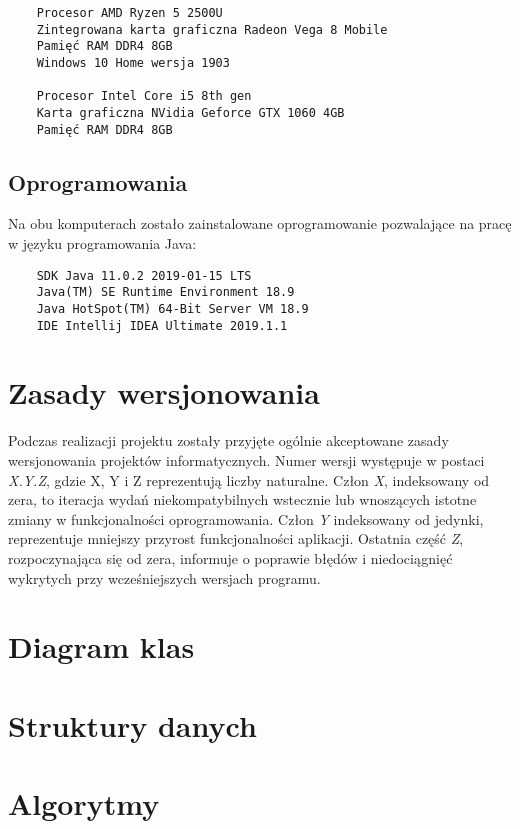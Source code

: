 \documentclass{article}
\begin{document}
\begin{verbatim}
    Procesor AMD Ryzen 5 2500U
    Zintegrowana karta graficzna Radeon Vega 8 Mobile
    Pamięć RAM DDR4 8GB
    Windows 10 Home wersja 1903
    
    Procesor Intel Core i5 8th gen
    Karta graficzna NVidia Geforce GTX 1060 4GB
    Pamięć RAM DDR4 8GB
\end{verbatim}

\subsection{Oprogramowania}

Na obu komputerach zostało zainstalowane oprogramowanie pozwalające na pracę w języku programowania Java:

\begin{verbatim}
    SDK Java 11.0.2 2019-01-15 LTS
    Java(TM) SE Runtime Environment 18.9
    Java HotSpot(TM) 64-Bit Server VM 18.9
    IDE Intellij IDEA Ultimate 2019.1.1 
\end{verbatim}

\section{Zasady wersjonowania}

Podczas realizacji projektu zostały przyjęte ogólnie akceptowane zasady wersjonowania projektów informatycznych. Numer wersji występuje w postaci \textit{X.Y.Z}, gdzie X, Y i Z reprezentują liczby naturalne. Człon \textit{X}, indeksowany od zera, to iteracja wydań niekompatybilnych wstecznie lub wnoszących istotne zmiany w funkcjonalności oprogramowania. Człon \textit{Y} indeksowany od jedynki, reprezentuje mniejszy przyrost funkcjonalności aplikacji. Ostatnia część \textit{Z}, rozpoczynająca się od zera, informuje o poprawie błędów i niedociągnięć wykrytych przy wcześniejszych wersjach programu.

\section{Diagram klas}


\section{Struktury danych}


\section{Algorytmy}
\end{document}
